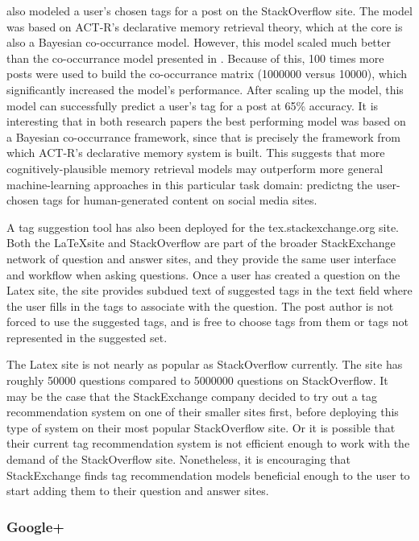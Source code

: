 \documentclass[man,floatsintext]{apa6}
\begin{document}
\textcite{Stanley2013} also modeled a user's chosen tags for a post on the StackOverflow site.
The model was based on ACT-R's declarative memory retrieval theory, which at the core is also a Bayesian co-occurrance model.
However, this model scaled much better than the co-occurrance model presented in \textcite{Kuo2011}.
Because of this, 100 times more posts were used to build the co-occurrance matrix (\num{1000000} versus \num{10000}), which significantly increased the model's performance.
After scaling up the model, this model can successfully predict a user's tag for a post at 65\% accuracy.
It is interesting that in both research papers the best performing model was based on a Bayesian co-occurrance framework, since that is precisely the framework from which ACT-R's declarative memory system is built.
This suggests that more cognitively-plausible memory retrieval models may outperform more general machine-learning approaches in this particular task domain:
predictng the user-chosen tags for human-generated content on social media sites.

A tag suggestion tool has also been deployed for the tex.stackexchange.org site. \parencite{LatexTags2013}
Both the \LaTeX site and StackOverflow are part of the broader StackExchange network of question and answer sites, and they provide the same user interface and workflow when asking questions.
Once a user has created a question on the Latex site, the site provides subdued text of suggested tags in the text field where the user fills in the tags to associate with the question.
The post author is not forced to use the suggested tags, and is free to choose tags from them or tags not represented in the suggested set.

The Latex site is not nearly as popular as StackOverflow currently.
The site has roughly \num{50000} questions compared to \num{5000000} questions on StackOverflow.
It may be the case that the StackExchange company decided to try out a tag recommendation system on one of their smaller sites first, before deploying this type of system on their most popular StackOverflow site.
Or it is possible that their current tag recommendation system is not efficient enough to work with the demand of the StackOverflow site.
Nonetheless, it is encouraging that StackExchange finds tag recommendation models beneficial enough to the user to start adding them to their question and answer sites. 

\subsubsection{Google+}
\end{document}
